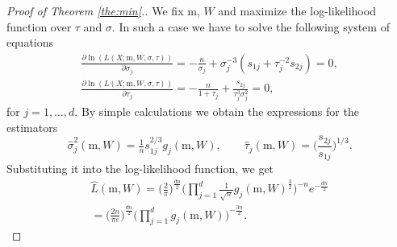 \documentclass[12pt]{article}
\def\w{\omega}
\def\x{\mathrm{x}}
\def\m{\mathrm{m}}
\newtheorem{theorem}{Theorem}[section]
\theoremstyle{definition}
\begin{document}
\begin{proof}[Proof of Theorem \ref{the:min}.]
We fix  $\m$, $W$ and maximize the log-likelihood function over $\tau$ and $\sigma$.
In such a case we have to solve the following system of equations
$$
\begin{array}{l}
\frac{\partial  \ln ( L(X;\m,W,\sigma,\tau) ) }{\partial \sigma_j} = -\frac{n}{\sigma_j} +  \sigma_j^{-3} (s_{1j} + \tau_j^{-2} s_{2j} )
 =0, \\[6pt] %
 \frac{\partial  \ln ( L(X;\m,W,\sigma,\tau) ) }{\partial \tau_j} = - \frac{n}{1+\tau_j} + \frac{s_{2j}}{\tau_j^{3}\sigma_j^{2}} =0 , %
\end{array}
$$
for  $ j=1,\ldots,d$.
By simple calculations we obtain the expressions for the estimators
$$
\hat{\sigma}_j^2(\m,W) = 
\tfrac{1}{n} s_{1j}^{2/3} g_{j}(\m,W), \qquad
\hat{\tau}_{j}(\m,W) = \bigg( \frac{s_{2j}}{s_{1j}} \bigg)^{1/3}.
$$
Substituting it into the log-likelihood function,
we get
$$
\begin{array}{l}
\hat{L}(\m,W) = \bigg( \frac{2}{\pi} \bigg)^{\frac{dn}{2}} \Big( \prod\limits_{j=1}^{d} \frac{1}{\sqrt{n}} g_j(\m,W)^{\frac{3}{2}} \Big)^{-n}  e^{-\frac{dn}{2}}\\[6pt]
= \bigg( \frac{2n}{\pi e} \bigg)^{\frac{dn}{2}}  \Big( \prod\limits_{j=1}^{d} g_j(\m,W) \Big)^{-\frac{3n}{2}}. 
\end{array}
$$
\end{proof}

\end{document}
